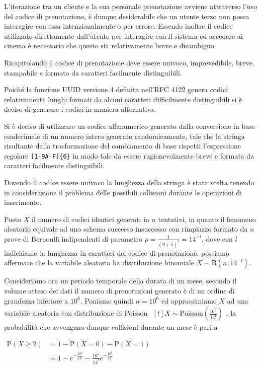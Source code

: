 L'iterazione tra un cliente e la sua personale prenotazione avviene attraverso
l'uso del codice di prenotazione, è dunque desiderabile che un utente terzo non
possa interagire con essa intenzionalmente o per errore. Essendo inoltre
il codice utilizzato direttamente dall'utente per interagire con il sistema
ed accedere ai cinema è necessario che questo sia relativamente breve e
disambiguo.

Ricapitolando il codice di prenotazione deve essere univoco, imprevedibile,
breve, stampabile e formato da caratteri facilmente distinguibili.

Poiché la funzione UUID versione 4 definita nell'RFC 4122 genera codici
relativamente lunghi formati da alcuni caratteri difficilmente distinguibili
si è deciso di generare i codici in maniera alternativa.

Si è deciso di utilizzare un codice alfanumerico generato dalla conversione in
base esadecimale di un numero intero generato randomicamente, tale che 
la stringa risultante dalla trasformazione del cambiamento di base rispetti
l'espressione regolare \verb|[1-9A-F]{6}| in modo tale da essere ragionevolmente
breve e formata da caratteri facilmente distinguibili.

Dovendo il codice essere univoco la lunghezza della stringa è stata scelta
tenendo in considerazione il problema delle possibili collisioni durante le
operazioni di inserimento.

Posto $X$ il numero di codici identici generati in $n$ tentativi, in quanto
il fenomeno aleatorio equivale ad uno schema successo insuccesso con rimpiazzo
formato da $n$ prove di Bernoulli indipendenti di parametro
$p = \frac{1}{\left( 9 + 5 \right)^l} = 14^{-l}$,
dove con $l$ indichiamo la lunghezza in caratteri del codice di prenotazione,
possiamo affermare che la variabile aleatoria ha distribuzione binomiale
$X \sim \mathrm{B}\left( n, 14^{-l} \right)$.

Consideriamo ora un periodo temporale della durata di un mese, secondo il volume
atteso dei dati il numero di prenotazioni generato è di un ordine di grandezza
inferiore a $10^6$. Poniamo quindi $n = 10^6$ ed approssimiamo $X$ ad una
variabile aleatoria con distribuzione di Poisson
$\begin{aligned}[t]
        X \sim \mathrm{Poisson}\left( \frac{10^6}{14^l} \right)
    \end{aligned}$,
la probabilità che avvengano dunque collisioni durante un mese è pari a

$\begin{aligned}
        \mathrm{P}\left( X \geq 2 \right)
         & = 1 - \mathrm{P}\left( X = 0 \right)
        - \mathrm{P}\left( X = 1 \right)           \\
         & = 1 - e^{-\frac{10^6}{14^l}}
        - \frac{10^6}{14^l} e^{-\frac{10^6}{14^l}} \\
    \end{aligned}$

